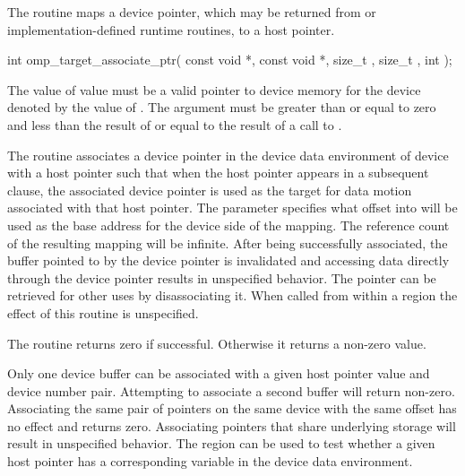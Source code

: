 \begin{ccppspecific}
The  routine maps a device pointer, which may
be returned from  or implementation-defined runtime
routines, to a host pointer.

\format
\begin{ompcFunction}
int omp_target_associate_ptr(
  const void *,
  const void *,
  size_t ,
  size_t ,
  int 
);
\end{ompcFunction}

\constraints

The value of  value must be a valid pointer to device
memory for the device denoted by the value of .
The  argument
must be greater than or equal to zero and less than the result of
 or equal to the result of a call to
.

\effect

The  routine associates a device pointer
in the device data environment of device 
with a host pointer such that when the host pointer appears in a subsequent
 clause, the associated device pointer is used as the target for
data motion associated with that host pointer.  The 
parameter specifies what offset into  will be used as the
base address for the device side of the mapping.  The reference count of the
resulting mapping will be infinite.  After being successfully associated, the
buffer pointed to by the device pointer is invalidated and accessing data
directly through the device pointer results in unspecified behavior.  The
pointer can be retrieved for other uses by disassociating it.
When called from within a  region
the effect of this routine is unspecified.

The routine returns zero if successful. Otherwise it returns a non-zero value.

Only one device buffer can be associated with a given host pointer value and
device number pair. Attempting to associate a second buffer will return
non-zero. Associating the same pair of pointers on the same device with the
same offset has no effect and returns zero.  Associating pointers that share
underlying storage will result in unspecified behavior. The
 region can be used to test whether a given
host pointer has a corresponding variable in the device data environment.


\end{ccppspecific}
